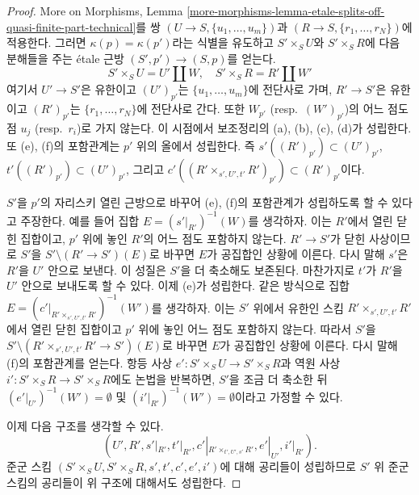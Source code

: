 \begin{proof}
\medskip\noindent
More on Morphisms, Lemma
\ref{more-morphisms-lemma-etale-splits-off-quasi-finite-part-technical}를 쌍
$(U \to S, \{u_1, \ldots, u_m\})$과
$(R \to S, \{r_1, \ldots, r_N\})$에 적용한다. 그러면
$\kappa(p) = \kappa(p')$라는 식별을 유도하고 $S' \times_S U$와
$S' \times_S R$에 다음 분해들을 주는 \'etale 근방
$(S', p') \to (S, p)$를 얻는다.
$$
S' \times_S U = U' \amalg W, \quad
S' \times_S R = R' \amalg W'
$$
여기서 $U' \to S'$은 유한이고 $(U')_{p'}$는
$\{u_1, \ldots, u_m\}$에 전단사로 가며, $R' \to S'$은 유한이고
$(R')_{p'}$는 $\{r_1, \ldots, r_N\}$에 전단사로 간다. 또한
$W_{p'}$ (resp.\ $(W')_{p'}$)의 어느 점도 점 $u_j$ (resp.\ $r_i$)로
가지 않는다. 이 시점에서 보조정리의 (a), (b), (c), (d)가 성립한다.
또 (e), (f)의 포함관계는 $p'$ 위의 올에서 성립한다. 즉
$s'((R')_{p'}) \subset (U')_{p'}$,
$t'((R')_{p'}) \subset (U')_{p'}$, 그리고
$c'((R' \times_{s', U', t'} R')_{p'}) \subset (R')_{p'}$이다.

\medskip\noindent
$S'$을 $p'$의 자리스키 열린 근방으로 바꾸어 (e), (f)의 포함관계가
성립하도록 할 수 있다고 주장한다. 예를 들어 집합
$E = (s'|_{R'})^{-1}(W)$를 생각하자. 이는 $R'$에서 열린 닫힌 집합이고,
$p'$ 위에 놓인 $R'$의 어느 점도 포함하지 않는다. $R' \to S'$가 닫힌
사상이므로 $S'$을 $S' \setminus (R' \to S')(E)$로 바꾸면 $E$가 공집합인
상황에 이른다. 다시 말해 $s'$은 $R'$을 $U'$ 안으로 보낸다. 이 성질은
$S'$을 더 축소해도 보존된다. 마찬가지로 $t'$가 $R'$을 $U'$ 안으로
보내도록 할 수 있다. 이제 (e)가 성립한다. 같은 방식으로 집합
$E = (c'|_{R' \times_{s', U', t'} R'})^{-1}(W')$를 생각하자.
이는 $S'$ 위에서 유한인 스킴 $R' \times_{s', U', t'} R'$에서 열린 닫힌
집합이고 $p'$ 위에 놓인 어느 점도 포함하지 않는다. 따라서 $S'$을
$S' \setminus (R' \times_{s', U', t'} R' \to S')(E)$로 바꾸면
$E$가 공집합인 상황에 이른다. 다시 말해 (f)의 포함관계를 얻는다.
항등 사상 $e' : S' \times_S U \to S' \times_S R$과 역원 사상
$i' : S' \times_S R \to S' \times_S R$에도 논법을 반복하면, $S'$을
조금 더 축소한 뒤 $(e'|_{U'})^{-1}(W') = \emptyset$ 및
$(i'|_{R'})^{-1}(W') = \emptyset$이라고 가정할 수 있다.

\medskip\noindent
이제 다음 구조를 생각할 수 있다.
$$
(U', R', s'|_{R'}, t'|_{R'}, c'|_{R' \times_{t', U', s'} R'},
e'|_{U'}, i'|_{R'}).
$$
준군 스킴 $(S' \times_S U, S' \times_S R, s', t', c', e', i')$에 대해
공리들이 성립하므로 $S'$ 위 준군 스킴의 공리들이 위 구조에 대해서도 성립한다.
\end{proof}

